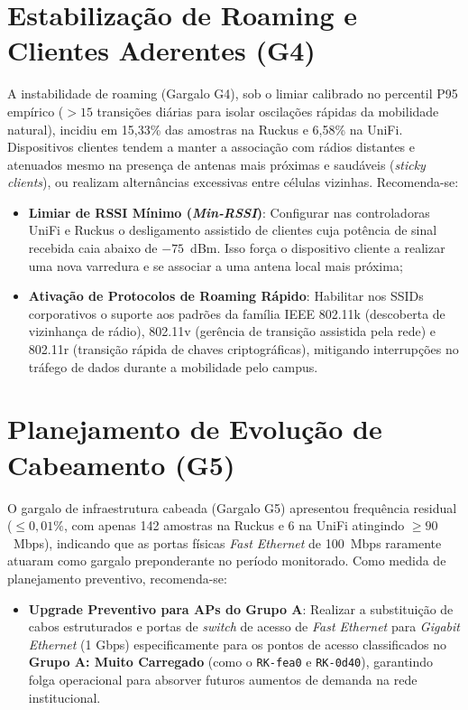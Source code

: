 \section{Estabilização de Roaming e Clientes Aderentes (G4)}
\label{sec:recomendacoes_g4}

A instabilidade de roaming (Gargalo G4), sob o limiar calibrado no percentil P95 empírico ($> 15$ transições diárias para isolar oscilações rápidas da mobilidade natural), incidiu em 15,33\% das amostras na Ruckus e 6,58\% na UniFi. Dispositivos clientes tendem a manter a associação com rádios distantes e atenuados mesmo na presença de antenas mais próximas e saudáveis (\textit{sticky clients}), ou realizam alternâncias excessivas entre células vizinhas. Recomenda-se:
\begin{itemize}
	\item \textbf{Limiar de RSSI Mínimo (\textit{Min-RSSI})}: Configurar nas controladoras UniFi e Ruckus o desligamento assistido de clientes cuja potência de sinal recebida caia abaixo de $-75$~dBm. Isso força o dispositivo cliente a realizar uma nova varredura e se associar a uma antena local mais próxima;
	\item \textbf{Ativação de Protocolos de Roaming Rápido}: Habilitar nos SSIDs corporativos o suporte aos padrões da família IEEE 802.11k (descoberta de vizinhança de rádio), 802.11v (gerência de transição assistida pela rede) e 802.11r (transição rápida de chaves criptográficas), mitigando interrupções no tráfego de dados durante a mobilidade pelo campus.
\end{itemize}

\section{Planejamento de Evolução de Cabeamento (G5)}
\label{sec:recomendacoes_g5}

O gargalo de infraestrutura cabeada (Gargalo G5) apresentou frequência residual ($\le 0,01\%$, com apenas 142 amostras na Ruckus e 6 na UniFi atingindo $\ge 90$~Mbps), indicando que as portas físicas \textit{Fast Ethernet} de 100~Mbps raramente atuaram como gargalo preponderante no período monitorado. Como medida de planejamento preventivo, recomenda-se:
\begin{itemize}
	\item \textbf{Upgrade Preventivo para APs do Grupo A}: Realizar a substituição de cabos estruturados e portas de \textit{switch} de acesso de \textit{Fast Ethernet} para \textit{Gigabit Ethernet} (1 Gbps) especificamente para os pontos de acesso classificados no \textbf{Grupo A: Muito Carregado} (como o \texttt{RK-fea0} e \texttt{RK-0d40}), garantindo folga operacional para absorver futuros aumentos de demanda na rede institucional.
\end{itemize}

